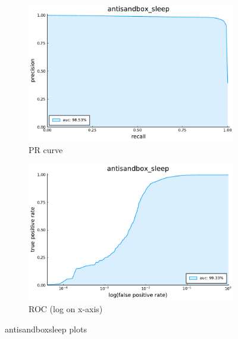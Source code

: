\begin{figure}
    \centering
    \begin{subfigure}{.49\textwidth}
      \centering
      \includegraphics[width=1\linewidth]{pdfs/modperf/antisandbox_sleep.bson-pr.pdf}
      \caption{PR curve}
    \end{subfigure}
    \begin{subfigure}{.49\textwidth}
        \centering
        \includegraphics[width=1\linewidth]{pdfs/modperf/antisandbox_sleep.bson-roclog.pdf}
        \caption{ROC (log on x-axis)}
    \end{subfigure}
    \caption{antisandboxsleep plots}
    \label{fig:fig}
\end{figure}

